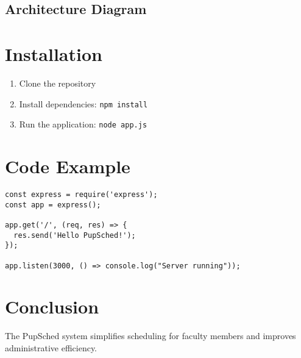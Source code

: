 \documentclass[12pt,letterpaper]{article}
\begin{document}
\subsection{Architecture Diagram}
\begin{center}
\end{center}

\section{Installation}
\begin{enumerate}       
    \item Clone the repository
    \item Install dependencies: \texttt{npm install}
    \item Run the application: \texttt{node app.js}
\end{enumerate}

\section{Code Example}
\begin{lstlisting}[caption={Sample Node.js Code}]
const express = require('express');
const app = express();

app.get('/', (req, res) => {
  res.send('Hello PupSched!');
});

app.listen(3000, () => console.log("Server running"));
\end{lstlisting}

\section{Conclusion}
The PupSched system simplifies scheduling for faculty members and improves administrative efficiency.
\end{document}
